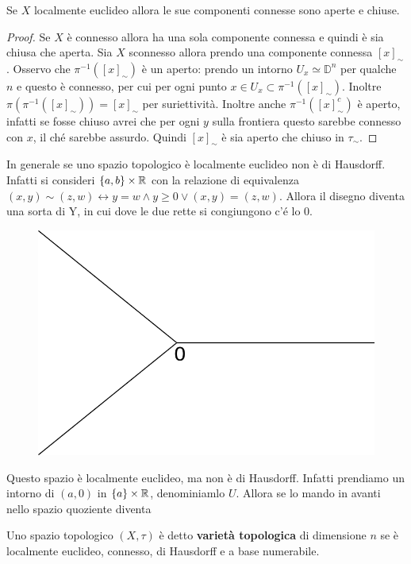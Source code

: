 \begin{theorem}
	Se $X$ localmente euclideo allora le sue componenti connesse sono aperte e chiuse.
\end{theorem}
\begin{proof}
	Se $X$ è connesso allora ha una sola componente connessa e quindi è sia chiusa che aperta.
	Sia $X$ sconnesso allora prendo una componente connessa $\left[x\right]_\sim$. Osservo che $\pi^{-1}(\left[x\right]_\sim)$ è un aperto: prendo un intorno $U_x \simeq \mathbb{D}^n$ per qualche $n$ e questo è connesso, per cui per ogni punto $x \in U_x \subset \pi^{-1}(\left[x\right]_\sim)$. Inoltre $\pi(\pi^{-1}(\left[x\right]_\sim)) = \left[x\right]_\sim$ per suriettività. Inoltre anche $\pi^{-1}(\left[x\right]^c_\sim)$ è aperto, infatti se fosse chiuso avrei che per ogni $y$ sulla frontiera questo sarebbe connesso con $x$, il ché sarebbe assurdo. Quindi $\left[x\right]_\sim$ è sia aperto che chiuso in $\tau_\sim$.
\end{proof}

\begin{remark}
	In generale se uno spazio topologico è localmente euclideo non è di Hausdorff. Infatti si consideri $\{a,b\} \times \mathbb{R}$ con la relazione di equivalenza $(x,y) \sim (z,w) \leftrightarrow y = w \land y \ge 0 \lor (x,y) = (z,w)$. Allora il disegno diventa una sorta di Y, in cui dove le due rette si congiungono c'é lo 0.
	\begin{figure}[H]
		\centering
		\includegraphics[width=0.35\linewidth]{images/topologia_generale/lcleucnott2}
		\caption{}
		\label{fig:lcleucnott2}
	\end{figure}
	
	Questo spazio è localmente euclideo, ma non è di Hausdorff. Infatti prendiamo un intorno di $(a,0)$ in $\{a\} \times \mathbb{R}$, denominiamlo $U$. Allora se lo mando in avanti nello spazio quoziente diventa 
\end{remark}

\begin{definition}
	Uno spazio topologico $(X,\tau)$ è detto \textbf{varietà topologica} di dimensione $n$ se è localmente euclideo, connesso, di Hausdorff e a base numerabile.
\end{definition}

